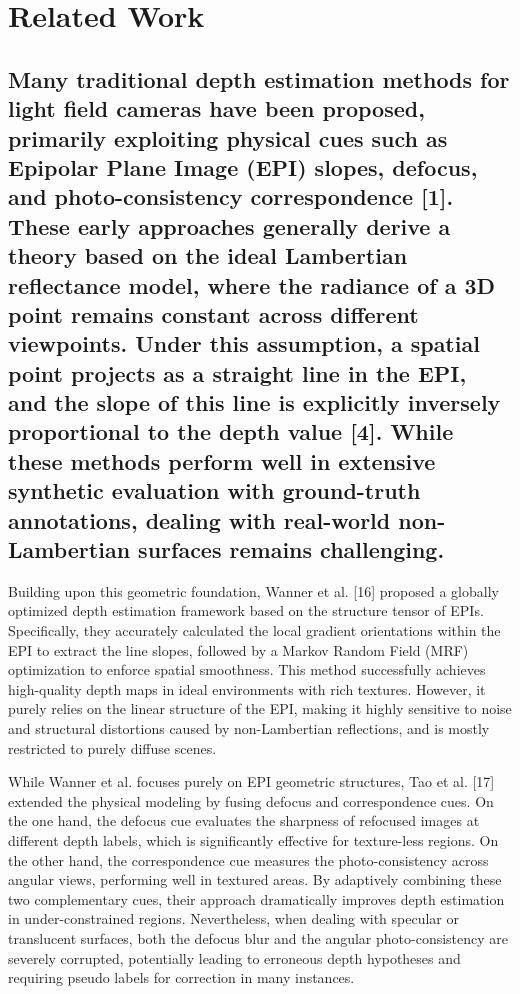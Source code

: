 \section{Related Work}

\subsection{Many traditional depth estimation methods for light field cameras have been proposed, primarily exploiting physical cues such as Epipolar Plane Image (EPI) slopes, defocus, and photo-consistency correspondence [1]. These early approaches generally derive a theory based on the ideal Lambertian reflectance model, where the radiance of a 3D point remains constant across different viewpoints. Under this assumption, a spatial point projects as a straight line in the EPI, and the slope of this line is explicitly inversely proportional to the depth value [4]. While these methods perform well in extensive synthetic evaluation with ground-truth annotations, dealing with real-world non-Lambertian surfaces remains challenging.}

Building upon this geometric foundation, Wanner et al. [16] proposed a globally optimized depth estimation framework based on the structure tensor of EPIs. Specifically, they accurately calculated the local gradient orientations within the EPI to extract the line slopes, followed by a Markov Random Field (MRF) optimization to enforce spatial smoothness. This method successfully achieves high-quality depth maps in ideal environments with rich textures. However, it purely relies on the linear structure of the EPI, making it highly sensitive to noise and structural distortions caused by non-Lambertian reflections, and is mostly restricted to purely diffuse scenes.

While Wanner et al. focuses purely on EPI geometric structures, Tao et al. [17] extended the physical modeling by fusing defocus and correspondence cues. On the one hand, the defocus cue evaluates the sharpness of refocused images at different depth labels, which is significantly effective for texture-less regions. On the other hand, the correspondence cue measures the photo-consistency across angular views, performing well in textured areas. By adaptively combining these two complementary cues, their approach dramatically improves depth estimation in under-constrained regions. Nevertheless, when dealing with specular or translucent surfaces, both the defocus blur and the angular photo-consistency are severely corrupted, potentially leading to erroneous depth hypotheses and requiring pseudo labels for correction in many instances.

